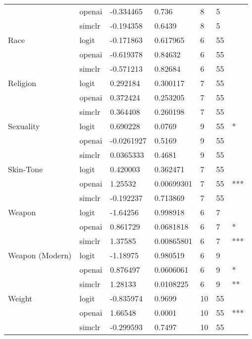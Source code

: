 \begin{tabular}{lllllll}
       & openai &  -0.334465 &       0.736 &   8 &   5 &      \\
       & simclr &  -0.194358 &      0.6439 &   8 &   5 &      \\
Race & logit &  -0.171863 &    0.617965 &   6 &  55 &      \\
       & openai &  -0.619378 &     0.84632 &   6 &  55 &      \\
       & simclr &  -0.571213 &     0.82684 &   6 &  55 &      \\
Religion & logit &   0.292184 &    0.300117 &   7 &  55 &      \\
       & openai &   0.372424 &    0.253205 &   7 &  55 &      \\
       & simclr &   0.364408 &    0.260198 &   7 &  55 &      \\
Sexuality & logit &   0.690228 &      0.0769 &   9 &  55 &    * \\
       & openai & -0.0261927 &      0.5169 &   9 &  55 &      \\
       & simclr &  0.0365333 &      0.4681 &   9 &  55 &      \\
Skin-Tone & logit &   0.420003 &    0.362471 &   7 &  55 &      \\
       & openai &    1.25532 &  0.00699301 &   7 &  55 &  *** \\
       & simclr &  -0.192237 &    0.713869 &   7 &  55 &      \\
Weapon & logit &   -1.64256 &    0.998918 &   6 &   7 &      \\
       & openai &   0.861729 &   0.0681818 &   6 &   7 &    * \\
       & simclr &    1.37585 &  0.00865801 &   6 &   7 &  *** \\
Weapon (Modern) & logit &   -1.18975 &    0.980519 &   6 &   9 &      \\
       & openai &   0.876497 &   0.0606061 &   6 &   9 &    * \\
       & simclr &    1.28133 &   0.0108225 &   6 &   9 &   ** \\
Weight & logit &  -0.835974 &      0.9699 &  10 &  55 &      \\
       & openai &    1.66548 &      0.0001 &  10 &  55 &  *** \\
       & simclr &  -0.299593 &      0.7497 &  10 &  55 &      \\
\bottomrule
\end{tabular}
